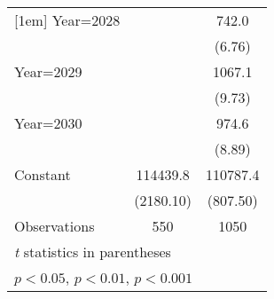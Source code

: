 {\begin{longtable}{l*{2}{c}}
[1em]
Year=2028           &                     &       742.0\sym{***}\\
                    &                     &      (6.76)         \\
[1em]
Year=2029           &                     &      1067.1\sym{***}\\
                    &                     &      (9.73)         \\
[1em]
Year=2030           &                     &       974.6\sym{***}\\
                    &                     &      (8.89)         \\
[1em]
Constant            &    114439.8\sym{***}&    110787.4\sym{***}\\
                    &   (2180.10)         &    (807.50)         \\
\hline
Observations        &         550         &        1050         \\
\hline\hline
\multicolumn{3}{l}{\footnotesize \textit{t} statistics in parentheses}\\
\multicolumn{3}{l}{\footnotesize \sym{*} \(p<0.05\), \sym{**} \(p<0.01\), \sym{***} \(p<0.001\)}\\
\end{longtable}
}
